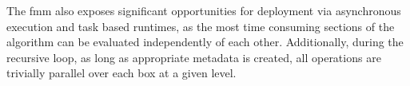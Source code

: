 The \acrshort{fmm} also exposes significant opportunities for deployment via asynchronous execution and task based runtimes, as the most time consuming sections of the algorithm can be evaluated independently of each other. Additionally, during the recursive loop, as long as appropriate metadata is created, all operations are trivially parallel over each box at a given level.

